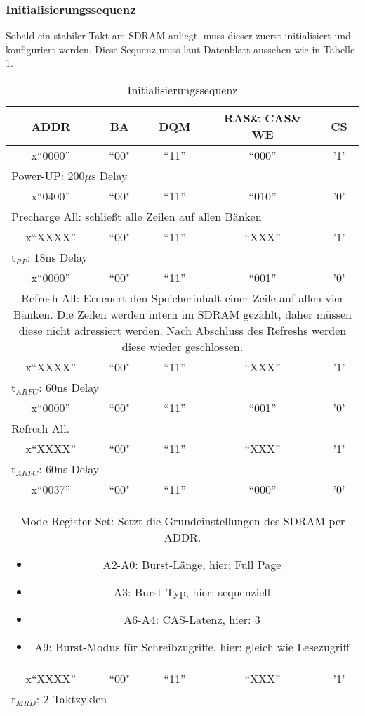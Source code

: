 \subsubsection*{Initialisierungssequenz}
Sobald ein stabiler Takt am SDRAM anliegt, muss dieser zuerst initialisiert und konfiguriert werden. Diese Sequenz muss laut Datenblatt\cite{ZENT} aussehen wie in Tabelle \ref{tab:init-seq}.

\begin{table}[h!]
\caption{Initialisierungssequenz}
\label{tab:init-seq}
\centering
\setlength{\tabcolsep}{1ex}
\def\arraystretch{1.20}
\setlength{\tabcolsep}{1ex}
\small
\begin{tabularx}{\textwidth}{|ccccc|}
\hline 
ADDR & BA & DQM & RAS\& CAS\& WE & CS\\ 
\hline 
x``0000'' & ``00" & ``11'' & ``000'' & '1'\\ 
\multicolumn{5}{|l|}{Power-UP: 200$\mu$s Delay} \\ 
\hline 
x``0400'' & ``00" & ``11'' & ``010'' & '0'  \\ 
\multicolumn{5}{|l|}{Precharge All: schließt alle Zeilen auf allen Bänken} \\
\hline 
x``XXXX'' & ``00" & ``11'' & ``XXX'' & '1' \\
\multicolumn{5}{|l|}{t$_{RP}$: 18ns Delay} \\ 
\hline 
x``0000'' & ``00" & ``11'' & ``001'' & '0'\\ 
\multicolumn{5}{|X|}{Refresh All: Erneuert den Speicherinhalt einer Zeile auf allen vier Bänken. Die Zeilen werden intern im SDRAM gezählt, daher müssen diese nicht adressiert werden. Nach Abschluss des Refreshs werden diese wieder geschlossen.} \\
\hline 
x``XXXX'' & ``00" & ``11'' & ``XXX'' & '1' \\ 
\multicolumn{5}{|l|}{t$_{ARFC}$: 60ns Delay} \\
\hline
x``0000'' & ``00" & ``11'' & ``001'' & '0'\\ 
\multicolumn{5}{|l|}{ Refresh All.} \\
\hline 
x``XXXX'' & ``00" & ``11'' & ``XXX'' & '1'\\
\multicolumn{5}{|l|}{ t$_{ARFC}$: 60ns Delay} \\ 
\hline 
x``0037'' & ``00" & ``11'' & ``000'' & '0'\\
\multicolumn{5}{|X|}{Mode Register Set: Setzt die Grundeinstellungen des SDRAM per ADDR.\begin{itemize}
\item A2-A0: Burst-Länge, hier: Full Page
\item A3: Burst-Typ, hier: sequenziell
\item A6-A4: CAS-Latenz, hier: 3
\item A9: Burst-Modus für Schreibzugriffe, hier: gleich wie Lesezugriff
\end{itemize}} \\ 
\hline 
x``XXXX'' & ``00" & ``11'' & ``XXX'' & '1'\\ 
\multicolumn{5}{|l|}{r$_{MRD}$: 2 Taktzyklen} \\
\hline 
\end{tabularx} 
\end{table}
\FloatBarrier

